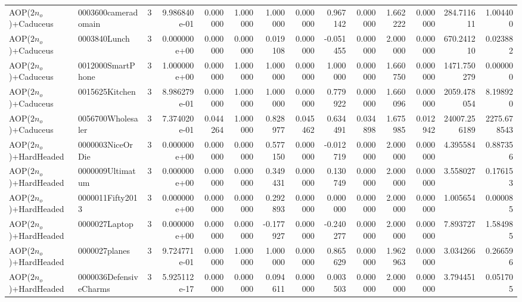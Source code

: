 \begin{tabular}{llrr|r|rr|rr|rr|rrr}
    AOP($2 n_o$)+Caduceus &    0003600cameradomain &       3 & 9.986840e-01 & 0.000000 & 1.000000 &      1.000000 & 0.000000 &      0.967142 & 0.000000 &      1.662222 &    0.000000 &   284.711611 &    1.004400 \\
    AOP($2 n_o$)+Caduceus &           0003840Lunch &       3 & 0.000000e+00 & 0.000000 & 0.000000 &      0.019108 & 0.000000 &     -0.051455 & 0.000000 &      2.000000 &    0.000000 &   670.241210 &    0.023882 \\
    AOP($2 n_o$)+Caduceus &      0012000SmartPhone &       3 & 1.000000e+00 & 0.000000 & 1.000000 &      1.000000 & 0.000000 &      1.000000 & 0.000000 &      1.660750 &    0.000000 &  1471.750279 &    0.000000 \\
    AOP($2 n_o$)+Caduceus &         0015625Kitchen &       3 & 8.986279e-01 & 0.000000 & 1.000000 &      1.000000 & 0.000000 &      0.779922 & 0.000000 &      1.660096 &    0.000000 &  2059.478054 &    8.198920 \\
    AOP($2 n_o$)+Caduceus &      0056700Wholesaler &       3 & 7.374020e-01 & 0.044264 & 1.000000 &      0.828977 & 0.045462 &      0.634491 & 0.034898 &      1.675985 &    0.012942 & 24007.256189 & 2275.678543 \\
  AOP($2 n_o$)+HardHeaded &       0000003NiceOrDie &       3 & 0.000000e+00 & 0.000000 & 0.000000 &      0.577150 & 0.000000 &     -0.012719 & 0.000000 &      2.000000 &    0.000000 &     4.395584 &    0.887356 \\
  AOP($2 n_o$)+HardHeaded &       0000009Ultimatum &       3 & 0.000000e+00 & 0.000000 & 0.000000 &      0.349431 & 0.000000 &      0.130749 & 0.000000 &      2.000000 &    0.000000 &     3.558027 &    0.176153 \\
  AOP($2 n_o$)+HardHeaded &       0000011Fifty2013 &       3 & 0.000000e+00 & 0.000000 & 0.000000 &      0.292893 & 0.000000 &      0.000000 & 0.000000 &      2.000000 &    0.000000 &     1.005654 &    0.000085 \\
  AOP($2 n_o$)+HardHeaded &          0000027Laptop &       3 & 0.000000e+00 & 0.000000 & 0.000000 &     -0.177927 & 0.000000 &     -0.240277 & 0.000000 &      2.000000 &    0.000000 &     7.893727 &    1.584985 \\
  AOP($2 n_o$)+HardHeaded &          0000027planes &       3 & 9.724771e-01 & 0.000000 & 1.000000 &      1.000000 & 0.000000 &      0.865629 & 0.000000 &      1.962963 &    0.000000 &     3.034266 &    0.266596 \\
  AOP($2 n_o$)+HardHeaded & 0000036DefensiveCharms &       3 & 5.925112e-17 & 0.000000 & 0.000000 &      0.094611 & 0.000000 &      0.003503 & 0.000000 &      2.000000 &    0.000000 &     3.794451 &    0.051705 \\

\end{tabular}
